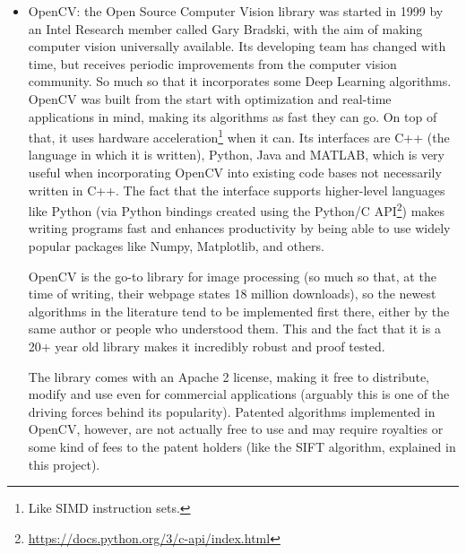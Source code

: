 \documentclass[../main.tex]{subfiles}
\begin{document}
\begin{itemize}
    \item OpenCV: the Open Source Computer Vision library was started in 1999 by an Intel Research member called Gary Bradski, with the aim of making computer vision universally available. Its developing team has changed with time, but receives periodic improvements from the computer vision community. So much so that it incorporates some Deep Learning algorithms. OpenCV was built from the start with optimization and real-time applications in mind, making its algorithms as fast they can go. On top of that, it uses hardware acceleration\footnote{Like SIMD instruction sets.} when it can. Its interfaces are C++ (the language in which it is written), Python, Java and MATLAB, which is very useful when incorporating OpenCV into existing code bases not necessarily written in C++. The fact that the interface supports higher-level languages like Python (via Python bindings created using the Python/C API\footnote{\url{https://docs.python.org/3/c-api/index.html}}) makes writing programs fast and enhances productivity by being able to use widely popular packages like Numpy, Matplotlib, and others.
    
    OpenCV is the go-to library for image processing (so much so that, at the time of writing, their webpage states 18 million downloads), so the newest algorithms in the literature tend to be implemented first there, either by the same author or people who understood them. This and the fact that it is a 20+ year old library makes it incredibly robust and proof tested.

    The library comes with an Apache 2 license, making it free to distribute, modify and use even for commercial applications (arguably this is one of the driving forces behind its popularity). Patented algorithms implemented in OpenCV, however, are not actually free to use and may require royalties or some kind of fees to the patent holders (like the SIFT algorithm, explained in this project).


\end{itemize}
\end{document}
